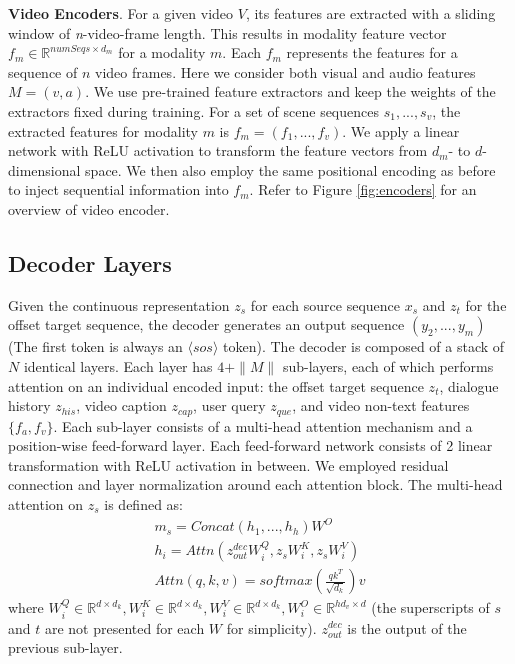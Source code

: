 \documentclass[11pt,a4paper]{article}
\begin{document}
\textbf{Video Encoders}. For a given video $V$, its features are extracted with a sliding window of \textit{n}-video-frame length. This results in modality feature vector $f_m \in \mathbb{R}^{numSeqs \times d_m}$ for a modality $m$. Each $f_m$ represents the features for a sequence of $n$ video frames. Here we consider both visual and audio features $M=(v,a)$. We use pre-trained feature extractors and keep the weights of the extractors fixed during training. For a set of scene sequences $s_1,...,s_v$, the extracted features for modality $m$ is $f_m=(f_1,...,f_v)$. 
We apply a linear network with ReLU activation to transform the feature vectors from $d_m$- to $d$-dimensional space. We then also employ the same positional encoding as before to inject sequential information into $f_m$. Refer to Figure \ref{fig:encoders} for an overview of video encoder.

\subsection{Decoder Layers}
Given the continuous representation $z_s$ for each source sequence $x_s$ and $z_t$ for the offset target sequence, the decoder generates an output sequence $(y_2,...,y_m)$ (The first token is always an $\langle sos \rangle$ token). The decoder is composed of a stack of $N$ identical layers. Each layer has $4 + \|M\|$ sub-layers, each of which performs attention on an individual encoded input: the offset target sequence $z_t$, dialogue history $z_{his}$, video caption $z_{cap}$, user query $z_{que}$, and video non-text features $\{f_a, f_v\}$. Each sub-layer consists of a multi-head attention mechanism and a position-wise feed-forward layer. Each feed-forward network consists of 2 linear transformation with ReLU activation in between. We employed residual connection \cite{he2016deep} and layer normalization \cite{ba2016layer} around each attention block. The multi-head attention on $z_s$ is defined as: 
\begin{align}
    m_s = Concat(h_1,...,h_h)W^O \\
    h_i = Attn(z^{dec}_{out} W^Q_i, z_s W^K_i, z_s W^V_i) \\
    Attn(q,k,v) = softmax(\frac{qk^T}{\sqrt{d_k}})v 
    \label{equa:multi_head}
\end{align}
where $ W^Q_i\in \mathbb{R}^{d \times d_k}, W^K_i\in \mathbb{R}^{d \times d_k}, W^V_i\in \mathbb{R}^{d \times d_k}, W^O_i\in \mathbb{R}^{hd_v \times d}$ (the superscripts of $s$ and $t$ are not presented for each $W$ for simplicity). $z^{dec}_{out}$ is the output of the previous sub-layer. 
\end{document}
